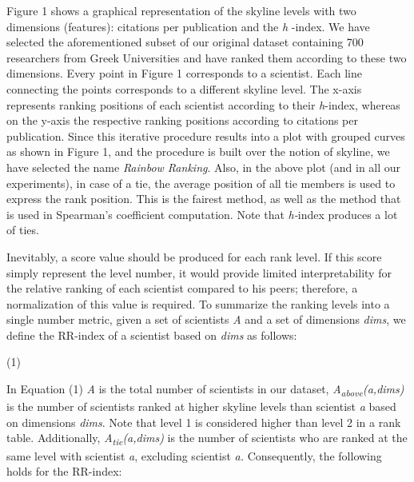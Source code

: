 Figure 1 shows a graphical representation of the skyline levels with two
dimensions (featu­res): citations per publication and the
\emph{h} -index. We have selected the aforementioned subset of our
original dataset containing 700 researchers from Greek Universities and
have ranked them according to these two dimensions. Every point in
Figure 1 corresponds to a scientist. Each li­ne connecting the points
corresponds to a different skyline level. The x-axis represents rank­ing
positions of each scientist according to their \emph{h}-index, whereas
on the y-axis the respective ranking positions according to citations
per publication. Since this iterative procedure results into a plot with
grouped curves as shown in Figure 1, and the procedure is built over the
no­tion of skyline, we have selected the name \emph{Rainbow Ranking}.
Also, in the above plot (and in all our experiments), in case of a tie,
the average position of all tie members is used to express the rank
position. This is the fairest method, as well as the method that is used
in Spearman's coefficient computation. Note that \emph{h-}index produces
a lot of ties.

Inevitably, a score value should be produced for each rank level. If
this score simply represent the level number, it would provide limited
interpretability for the relative ranking of each scientist compared to
his peers; therefore, a normalization of this value is required. To
sum­marize the ranking levels into a single number metric, given a set
of scientists \emph{A} and a set of dimensions \emph{dims}, we define
the RR-index of a scientist based on \emph{dims} as follows:

(1)

In Equation (1) \textbar{}\emph{A}\textbar{} is the total number of
scientists in our dataset,
\textbar{}\emph{A\textsubscript{above}(a,dims)}\textbar{} is the number
of scientists ranked at higher skyline levels than scientist \emph{a}
based on dimensions \emph{dims}. Note that level 1 is considered higher
than level 2 in a rank table. Additionally,
\textbar{}\emph{A\textsubscript{tie}(a,dims)}\textbar{} is the number of
scientists who are ranked at the same level with scientist \emph{a},
excluding scientist \emph{a.} Consequently, the following holds for the
RR-index:

